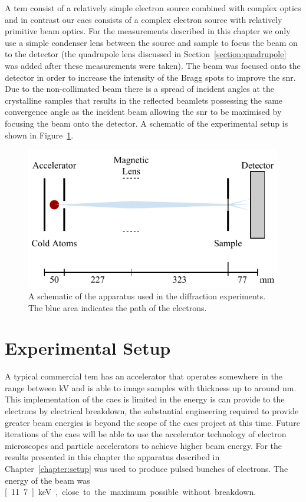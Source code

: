 A \gls{tem} consist of a relatively simple electron source combined with complex optics and in contrast our \gls{caes} consists of a complex electron source with relatively primitive beam optics.
For the measurements described in this chapter we only use a simple condenser lens between the source and sample to focus the beam on to the detector (the quadrupole lens discussed in Section~\ref{section:quadrupole} was added after these measurements were taken).
The beam was focused onto the detector in order to increase the intensity of the Bragg spots to improve the \gls{snr}.
Due to the non-collimated beam there is a spread of incident angles at the crystalline samples that results in the reflected beamlets possessing the same convergence angle as the incident beam allowing the \gls{snr} to be maximised by focusing the beam onto the detector.
A schematic of the experimental setup is shown in Figure~\ref{figure:diffraction_geometry}.

\begin{figure}
    \center
    \includegraphics{part2/Figs/DiffractionGeometry.pdf}
    \caption[A schematic of the apparatus used for diffraction experiments.]{A schematic of the apparatus used in the diffraction experiments. The blue area indicates the path of the electrons.}
    \label{figure:diffraction_geometry}
\end{figure}

\section{Experimental Setup}

A typical commercial \gls{tem} has an accelerator that operates somewhere in the range between \unit[50--300]{kV} and is able to image samples with thickness up to around \unit[200]{nm}.
This implementation of the \gls{caes} is limited in the energy is can provide to the electrons by electrical breakdown, the substantial engineering required to provide greater beam energies is beyond the scope of the \gls{caes} project at this time.
Future iterations of the \gls{caes} will be able to use the accelerator technology of electron microscopes and particle accelerators to achieve higher beam energy.
For the results presented in this chapter the apparatus described in Chapter~\ref{chapter:setup} was used to produce pulsed bunches of electrons.
The energy of the beam was \unit[11.7]{keV}, close to the maximum possible without breakdown.

